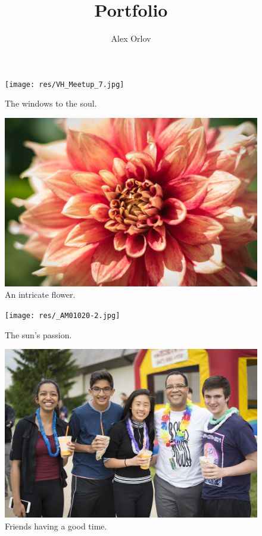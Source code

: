 \documentclass{report}
\title{Portfolio}
\author{Alex Orlov}
\date{}
\begin{document}
\maketitle

\begin{figure}
  \texttt{[image: res/VH\_Meetup\_7.jpg]}
  \caption{The windows to the soul.}
\end{figure}

\begin{figure}
  \includegraphics[width=\linewidth]{res/flowermacro.jpg}
  \caption{An intricate flower.}
\end{figure}

\begin{figure}
  \texttt{[image: res/\_AM01020-2.jpg]}
  \caption{The sun's passion.}
\end{figure}

\begin{figure}
  \includegraphics[width=\linewidth]{res/groupluau.jpg}
  \caption{Friends having a good time.}
\end{figure}
\end{document}

